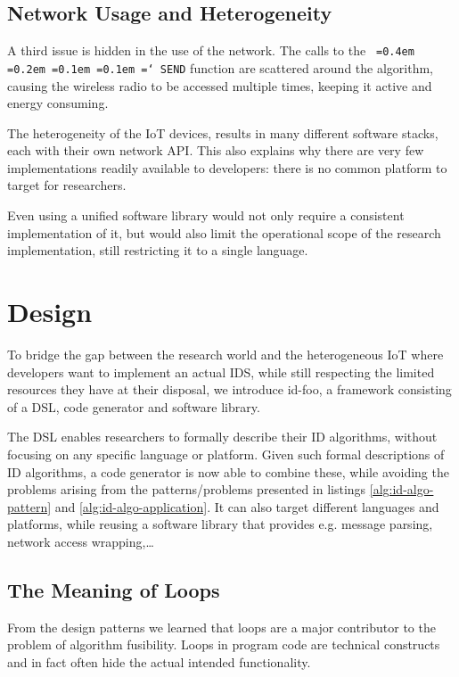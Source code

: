 \documentclass[conference]{IEEEtran}
\newcommand{\NAME}{id-foo\xspace}
\newcommand*\justify{%
  \fontdimen2\font=0.4em%
  \fontdimen3\font=0.2em%
  \fontdimen4\font=0.1em%
  \fontdimen7\font=0.1em%
  \hyphenchar\font=`\-%
}
\newcommand{\ttt}[1]{\texttt{\justify{#1}}}
\begin{document}
\subsection{Network Usage and Heterogeneity}

A third issue is hidden in the use of the network. The calls to the \ttt{SEND}
function are scattered around the algorithm, causing the wireless radio to be
accessed multiple times, keeping it active and energy consuming.

The heterogeneity of the IoT devices, results in many different software
stacks, each with their own network API. This also explains why there are very
few implementations readily available to developers: there is no common
platform to target for researchers.

Even using a unified software library would not only require a consistent
implementation of it, but would also limit the operational scope of the
research implementation, still restricting it to a single language.

\section{Design}
\label{design}

To bridge the gap between the research world and the heterogeneous IoT where
developers want to implement an actual IDS, while still respecting the limited
resources they have at their disposal, we introduce \NAME, a framework
consisting of a DSL, code generator and software library.

The DSL enables researchers to formally describe their ID algorithms, without
focusing on any specific language or platform. Given such formal descriptions
of ID algorithms, a code generator is now able to combine these, while avoiding
the problems arising from the patterns/problems presented in listings
\ref{alg:id-algo-pattern} and \ref{alg:id-algo-application}. It can also target
different languages and platforms, while reusing a software library that
provides e.g. message parsing, network access wrapping,\dots

\subsection{The Meaning of Loops}

From the design patterns we learned that loops are a major contributor to the
problem of algorithm fusibility. Loops in program code are technical constructs
and in fact often hide the actual intended functionality.
\end{document}

